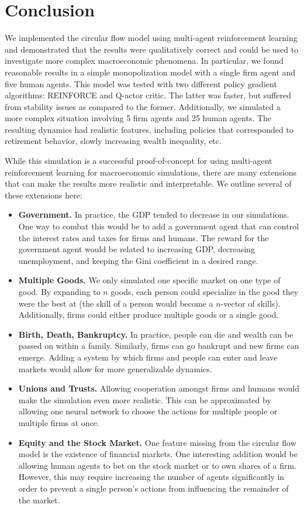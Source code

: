 \documentclass[twoside,twocolumn]{article}
\begin{document}
\section{Conclusion}

We implemented the circular flow model using multi-agent reinforcement learning and demonstrated that the results were qualitatively correct and could be used to investigate more complex macroeconomic phenomena. In particular, we found reasonable results in a simple monopolization model with a single firm agent and five human agents. This model was tested with two different policy gradient algorithms: REINFORCE and Q-actor critic. The latter was faster, but suffered from stability issues as compared to the former. Additionally, we simulated a more complex situation involving 5 firm agents and 25 human agents. The resulting dynamics had realistic features, including policies that corresponded to retirement behavior, slowly increasing wealth inequality, etc.

\medskip 

While this simulation is a successful proof-of-concept for using multi-agent reinforcement learning for  macroeconomic simulations, there are many extensions that can make the results more realistic and interpretable. We outline several of these extensions here:
\begin{itemize}
  \item \textbf{Government.} In practice, the GDP tended to decrease in our simulations. One way to combat this would be to add a government agent that can control the interest rates and taxes for firms and humans. The reward for the government agent would be related to increasing GDP, decreasing unemployment, and keeping the Gini coefficient in a desired range.
  \item \textbf{Multiple Goods.} We only simulated one specific market on one type of good. By expanding to $n$ goods, each person could specialize in the good they were the best at (the skill of a person would become a $n$-vector of skills). Additionally, firms could either produce multiple goods or a single good. 
  \item \textbf{Birth, Death, Bankruptcy.} In practice, people can die and wealth can be passed on within a family. Similarly, firms can go bankrupt and new firms can emerge. Adding a system by which firms and people can enter and leave markets would allow for more generalizable dynamics.
  \item \textbf{Unions and Trusts.} Allowing cooperation amongst firms and humans would make the simulation even more realistic. This can be approximated by allowing one neural network to choose the actions for multiple people or multiple firms at once.
  \item \textbf{Equity and the Stock Market.} One feature missing from the circular flow model is the existence of financial markets. One interesting addition would be allowing human agents to bet on the stock market or to own shares of a firm. However, this may require increasing the number of agents significantly in order to prevent a single person's actions from influencing the remainder of the market.
\end{itemize}
\end{document}
